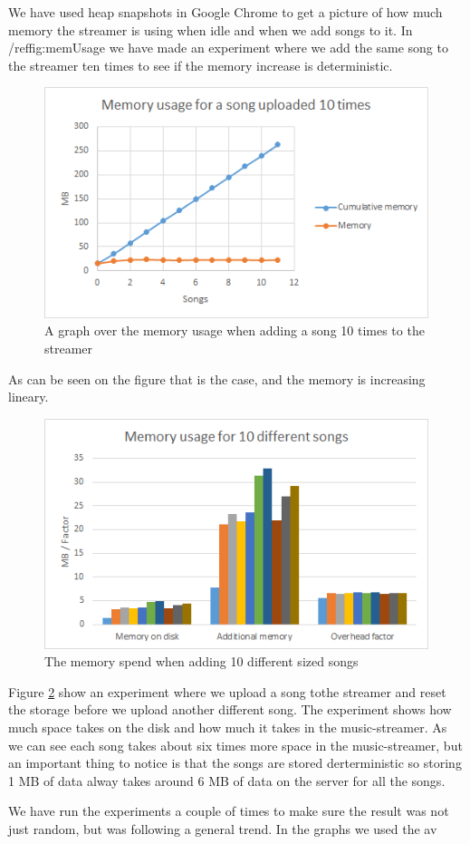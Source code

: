 We have used heap snapshots in Google Chrome to get a picture of how much memory the streamer is using when idle and when we add songs to it. In /ref{fig:memUsage} we have made an experiment where we add the same song to the streamer ten times to see if the memory increase is deterministic.
\begin{figure}[H]
	\centering
	\includegraphics[scale=0.9]{gfx/memoryUsage}
	\caption{A graph over the memory usage when adding a song 10 times to the streamer}
	\label{fig:memoryUsage}
\end{figure}
As can be seen on the figure that is the case, and the memory is increasing lineary.
\begin{figure}[H]
	\centering
	\includegraphics[scale=0.9]{gfx/memoryDiffSize}
	\caption{The memory spend when adding 10 different sized songs}
	\label{fig:memoryDiffSizes}
\end{figure}
Figure \ref{fig:memoryDiffSizes} show an experiment where we upload a song tothe streamer and reset the storage before we upload another different song. The experiment shows how much space takes on the disk and how much it takes in the music-streamer. As we can see each song takes about six times more space in the music-streamer, but an important thing to notice is that the songs are stored derterministic so storing 1 MB of data alway takes around 6 MB of data on the server for all the songs.

We have run the experiments a couple of times to make sure the result was not just random, but was following a general trend. In the graphs we used the av
